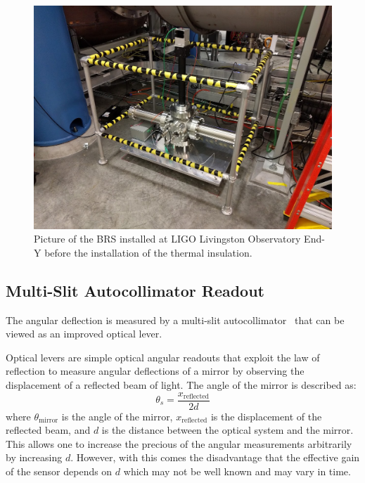 \documentclass [12pt, proquest]{uwthesis}[2019]
\begin{document}
\begin{figure}[!h]
\begin{center}
 \includegraphics[width=\textwidth]{BRSPic.jpg}
\caption[Picture of an installed BRS]{Picture of the BRS installed at LIGO Livingston Observatory End-Y before the installation of the thermal insulation.}
\label{BRSPic}
\end{center}
\end{figure}

\subsection{Multi-Slit Autocollimator Readout}

The angular deflection is measured by a multi-slit autocollimator~\cite{MSA} that can be viewed as an improved optical lever.

Optical levers are simple optical angular readouts that exploit the law of reflection to measure angular deflections of a mirror by observing the displacement of a reflected beam of light. The angle of the mirror is described as:
\begin{equation}
\theta_{s}=\frac{x_{\text{reflected}}}{2d}
\end{equation}
where $\theta_\text{mirror}$ is the angle of the mirror, $x_\text{reflected}$ is the displacement of the reflected beam, and $d$ is the distance between the optical system and the mirror. This allows one to increase the precious of the angular measurements arbitrarily by increasing $d$. However, with this comes the disadvantage that the effective gain of the sensor depends on $d$ which may not be well known and may vary in time.
\end{document}
